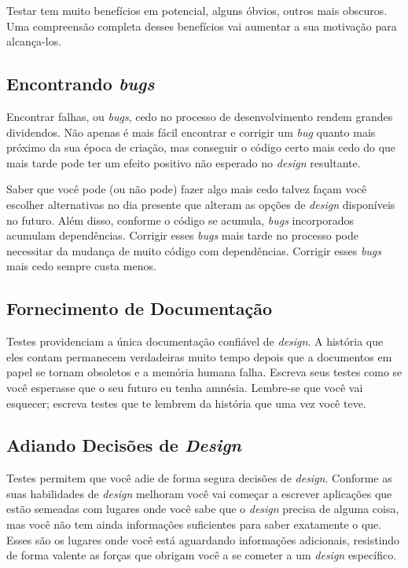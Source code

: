 Testar tem muito benefícios em potencial, alguns óbvios, outros mais obscuros. Uma compreensão completa desses benefícios vai aumentar a sua motivação para alcança-los.

\subsection{Encontrando \textit{bugs}}

Encontrar falhas, ou \textit{bugs}, cedo no processo de desenvolvimento rendem grandes dividendos. Não apenas é mais fácil encontrar e corrigir um \textit{bug} quanto mais próximo da sua época de criação, mas conseguir o código certo mais cedo do que mais tarde pode ter um efeito positivo não esperado no \textit{design} resultante.

Saber que você pode (ou não pode) fazer algo mais cedo talvez façam você escolher alternativas no dia presente que alteram as opções de \textit{design} disponíveis no futuro. Além disso, conforme o código se acumula, \textit{bugs} incorporados acumulam dependências. Corrigir esses \textit{bugs} mais tarde no processo pode necessitar da mudança de muito código com dependências. Corrigir esses \textit{bugs} mais cedo sempre custa menos.

\subsection{Fornecimento de Documentação}

Testes providenciam a única documentação confiável de \textit{design}. A história que eles contam permanecem verdadeiras muito tempo depois que a documentos em papel se tornam obsoletos e a memória humana falha. Escreva seus testes como se você esperasse que o seu futuro eu tenha amnésia. Lembre-se que você vai esquecer; escreva testes que te lembrem da história que uma vez você teve. 

\subsection{Adiando Decisões de \textit{Design}}

Testes permitem que você adie de forma segura decisões de \textit{design}. Conforme as suas habilidades de \textit{design} melhoram você vai começar a escrever aplicações que estão semeadas com lugares onde você sabe que o \textit{design} precisa de alguma coisa, mas você não tem ainda informações suficientes para saber exatamente o que. Esses são os lugares onde você está aguardando informações adicionais, resistindo de forma valente as forças que obrigam você a se cometer a um \textit{design} específico.

